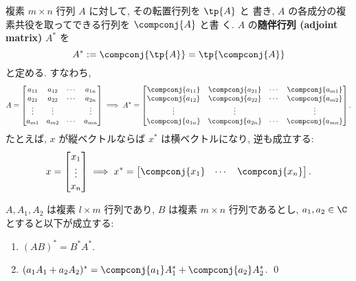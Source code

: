 \documentclass[12pt,twoside]{jarticle}
\begin{document}
複素 $m\times n$ 行列 $A$ に対して, その転置行列を $\tp{A}$ と
書き, $A$ の各成分の複素共役を取ってできる行列を $\compconj{A}$ と書
く. $A$ の{\bf 随伴行列 (adjoint matrix)} $A^*$ を
\begin{equation*}
  A^* := \compconj{\tp{A}} = \tp{\compconj{A}}
\end{equation*}
と定める. すなわち,
\begin{equation*}
  A =
  \begin{bmatrix}
    a_{11} & a_{12} & \cdots & a_{1n} \\
    a_{21} & a_{22} & \cdots & a_{2n} \\
    \vdots & \vdots &        & \vdots \\
    a_{m1} & a_{m2} & \cdots & a_{mn} \\
  \end{bmatrix}
  \implies
  A^* =
  \begin{bmatrix}
    \compconj{a_{11}} & \compconj{a_{21}} & \cdots & \compconj{a_{m1}} \\
    \compconj{a_{12}} & \compconj{a_{22}} & \cdots & \compconj{a_{m2}} \\
    \vdots            & \vdots            &        & \vdots \\
    \compconj{a_{1n}} & \compconj{a_{2n}} & \cdots & \compconj{a_{mn}} \\
  \end{bmatrix}.
\end{equation*}
たとえば, $x$ が縦ベクトルならば $x^*$ は横ベクトルになり, 逆も成立する:
\begin{equation*}
  x = 
  \begin{bmatrix}
    x_1 \\ \vdots \\ x_n
  \end{bmatrix}
  \implies
  x^* = 
  \begin{bmatrix}
    \compconj{x_1} & \cdots & \compconj{x_n}
  \end{bmatrix}.
\end{equation*}


\begin{question}[5点]
  $A,A_1,A_2$ は複素 $l\times m$ 行列であり, 
  $B$ は複素 $m\times n$ 行列であるとし,
  $a_1,a_2\in\C$ とすると以下が成立する:
  \begin{enumerate}
  \item $(AB)^* = B^*A^*$.
  \item $(a_1A_1+a_2A_2)^* = \compconj{a_1}A_1^* + \compconj{a_2}A_2^*$.
    \qed
  \end{enumerate}
\end{question}
\end{document}
